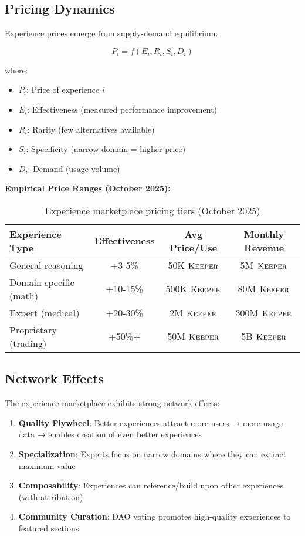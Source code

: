 \documentclass[11pt,letterpaper]{article}
\theoremstyle{definition}
\theoremstyle{remark}
\newcommand{\KEEPER}{\textsc{Keeper}}
\begin{document}
\subsection{Pricing Dynamics}

Experience prices emerge from supply-demand equilibrium:

\begin{equation}
P_i = f(E_i, R_i, S_i, D_i)
\end{equation}

where:
\begin{itemize}
\item $P_i$: Price of experience $i$
\item $E_i$: Effectiveness (measured performance improvement)
\item $R_i$: Rarity (few alternatives available)
\item $S_i$: Specificity (narrow domain = higher price)
\item $D_i$: Demand (usage volume)
\end{itemize}

\textbf{Empirical Price Ranges (October 2025):}

\begin{table}[h]
\centering
\begin{tabular}{lccc}
\toprule
\textbf{Experience Type} & \textbf{Effectiveness} & \textbf{Avg Price/Use} & \textbf{Monthly Revenue} \\
\midrule
General reasoning & +3-5\% & 50K $\KEEPER$ & 5M $\KEEPER$ \\
Domain-specific (math) & +10-15\% & 500K $\KEEPER$ & 80M $\KEEPER$ \\
Expert (medical) & +20-30\% & 2M $\KEEPER$ & 300M $\KEEPER$ \\
Proprietary (trading) & +50\%+ & 50M $\KEEPER$ & 5B $\KEEPER$ \\
\bottomrule
\end{tabular}
\caption{Experience marketplace pricing tiers (October 2025)}
\label{tab:experience_pricing}
\end{table}

\subsection{Network Effects}

The experience marketplace exhibits strong network effects:

\begin{enumerate}
\item \textbf{Quality Flywheel}: Better experiences attract more users → more usage data → enables creation of even better experiences
\item \textbf{Specialization}: Experts focus on narrow domains where they can extract maximum value
\item \textbf{Composability}: Experiences can reference/build upon other experiences (with attribution)
\item \textbf{Community Curation}: DAO voting promotes high-quality experiences to featured sections
\end{enumerate}
\end{document}
